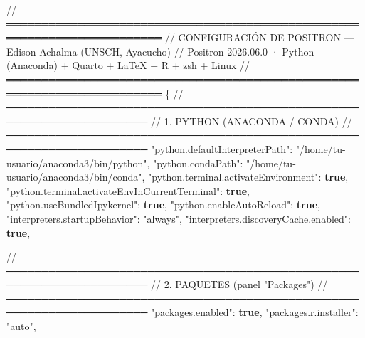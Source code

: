 \documentclass[
  doc,
  floatsintext,
  longtable,
  a4paper,
  nolmodern,
  notxfonts,
  notimes,
  12pt,
  colorlinks=true,linkcolor=blue,citecolor=blue,urlcolor=blue]{apa7}
\newenvironment{Shaded}{\begin{snugshade}}{\end{snugshade}}
\newcommand{\DataTypeTok}[1]{\textcolor[rgb]{0.68,0.00,0.00}{#1}}
\newcommand{\DecValTok}[1]{\textcolor[rgb]{0.68,0.00,0.00}{#1}}
\newcommand{\ErrorTok}[1]{\textcolor[rgb]{0.68,0.00,0.00}{#1}}
\newcommand{\FloatTok}[1]{\textcolor[rgb]{0.68,0.00,0.00}{#1}}
\newcommand{\FunctionTok}[1]{\textcolor[rgb]{0.28,0.35,0.67}{#1}}
\newcommand{\KeywordTok}[1]{\textcolor[rgb]{0.00,0.23,0.31}{\textbf{#1}}}
\newcommand{\StringTok}[1]{\textcolor[rgb]{0.13,0.47,0.30}{#1}}
\begin{document}
\begin{Shaded}
\begin{Highlighting}[]
\ErrorTok{//} \ErrorTok{════════════════════════════════════════════════════════════════════════}
\ErrorTok{//} \ErrorTok{CONFIGURACIÓN} \ErrorTok{DE} \ErrorTok{POSITRON} \ErrorTok{—} \ErrorTok{Edison} \ErrorTok{Achalma} \ErrorTok{(UNSCH,} \ErrorTok{Ayacucho)}
\ErrorTok{//} \ErrorTok{Positron} \FloatTok{2026.06}\ErrorTok{.}\DecValTok{0} \ErrorTok{·} \ErrorTok{Python} \ErrorTok{(Anaconda)} \ErrorTok{+} \ErrorTok{Quarto} \ErrorTok{+} \ErrorTok{LaTeX} \ErrorTok{+} \ErrorTok{R} \ErrorTok{+} \ErrorTok{zsh} \ErrorTok{+} \ErrorTok{Linux}
\ErrorTok{//} \ErrorTok{════════════════════════════════════════════════════════════════════════}
\FunctionTok{\{}
  \ErrorTok{//} \ErrorTok{──────────────────────────────────────────────────────────────────────}
  \ErrorTok{//} \ErrorTok{1.} \ErrorTok{PYTHON} \ErrorTok{(ANACONDA} \ErrorTok{/} \ErrorTok{CONDA)}
  \ErrorTok{//} \ErrorTok{──────────────────────────────────────────────────────────────────────}
  \DataTypeTok{"python.defaultInterpreterPath"}\FunctionTok{:} \StringTok{"/home/tu{-}usuario/anaconda3/bin/python"}\FunctionTok{,}
  \DataTypeTok{"python.condaPath"}\FunctionTok{:} \StringTok{"/home/tu{-}usuario/anaconda3/bin/conda"}\FunctionTok{,}
  \DataTypeTok{"python.terminal.activateEnvironment"}\FunctionTok{:} \KeywordTok{true}\FunctionTok{,}
  \DataTypeTok{"python.terminal.activateEnvInCurrentTerminal"}\FunctionTok{:} \KeywordTok{true}\FunctionTok{,}
  \DataTypeTok{"python.useBundledIpykernel"}\FunctionTok{:} \KeywordTok{true}\FunctionTok{,}
  \DataTypeTok{"python.enableAutoReload"}\FunctionTok{:} \KeywordTok{true}\FunctionTok{,}
  \DataTypeTok{"interpreters.startupBehavior"}\FunctionTok{:} \StringTok{"always"}\FunctionTok{,}
  \DataTypeTok{"interpreters.discoveryCache.enabled"}\FunctionTok{:} \KeywordTok{true}\FunctionTok{,}

  \ErrorTok{//} \ErrorTok{──────────────────────────────────────────────────────────────────────}
  \ErrorTok{//} \ErrorTok{2.} \ErrorTok{PAQUETES} \ErrorTok{(panel} \DataTypeTok{"Packages"}\ErrorTok{)}
  \ErrorTok{//} \ErrorTok{──────────────────────────────────────────────────────────────────────}
  \DataTypeTok{"packages.enabled"}\FunctionTok{:} \KeywordTok{true}\FunctionTok{,}
  \DataTypeTok{"packages.r.installer"}\FunctionTok{:} \StringTok{"auto"}\FunctionTok{,}


\end{Highlighting}
\end{Shaded}
\end{document}
